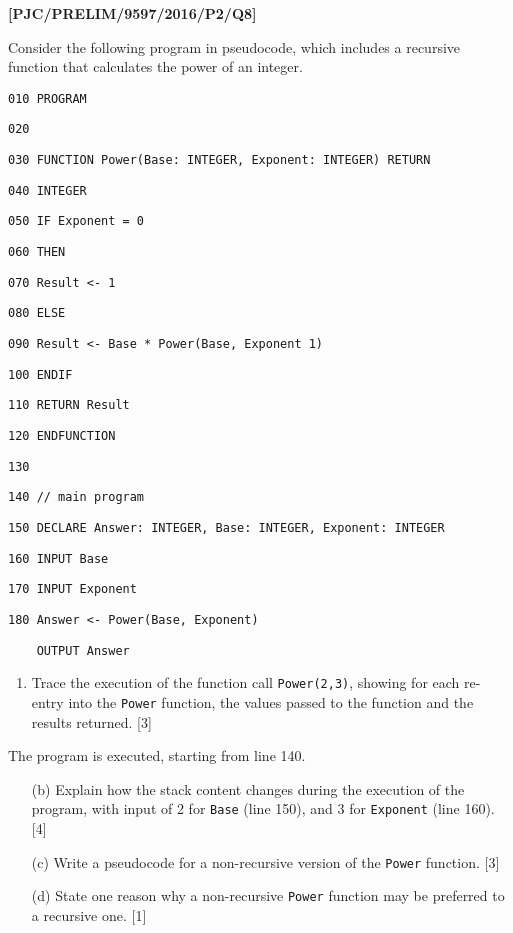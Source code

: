 \item \textbf{{[}PJC/PRELIM/9597/2016/P2/Q8{]} }

Consider the following program in pseudocode, which includes a recursive
function that calculates the power of an integer. 

\noindent %
\noindent\begin{minipage}[t]{1\columnwidth}%
\texttt{010 PROGRAM }

\texttt{020}

\texttt{030 FUNCTION Power(Base: INTEGER, Exponent: INTEGER) RETURN }

\texttt{040 INTEGER }

\texttt{050 \qquad{}IF Exponent = 0 }

\texttt{060 \qquad{}\qquad{}THEN }

\texttt{070 \qquad{}\qquad{}\qquad{}Result <- 1}

\texttt{080 \qquad{}\qquad{}ELSE }

\texttt{090 \qquad{}\qquad{}\qquad{}Result <- Base {*} Power(Base,
Exponent \textendash{} 1)}

\texttt{100 \qquad{}ENDIF }

\texttt{110 \qquad{}RETURN Result }

\texttt{120 ENDFUNCTION}

\texttt{130 }

\texttt{140~// main program}

\texttt{150 DECLARE Answer: INTEGER, Base: INTEGER, Exponent: INTEGER }

\texttt{160 INPUT Base }

\texttt{170 INPUT Exponent }

\texttt{180 Answer <- Power(Base, Exponent) }

\texttt{~~~~OUTPUT Answer }%
\end{minipage}
\begin{enumerate}
\item Trace the execution of the function call \texttt{Power(2,3)}, showing
for each re-entry into the \texttt{Power} function, the values passed
to the function and the results returned.\hfill{} {[}3{]}
\end{enumerate}
The program is executed, starting from line 140.
\begin{enumerate}
\item[(b)]  Explain how the stack content changes during the execution of the
program, with input of 2 for \texttt{Base} (line 150), and 3 for \texttt{Exponent}
(line 160).\hfill{} {[}4{]}
\item[(c)]  Write a pseudocode for a non-recursive version of the \texttt{Power}
function. \hfill{}{[}3{]}
\item[(d)]  State one reason why a non-recursive \texttt{Power} function may
be preferred to a recursive one. \hfill{}{[}1{]}
\end{enumerate}